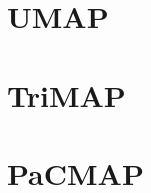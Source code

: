 \section{UMAP}\label{sec:umap}



\section{TriMAP}\label{sec:trimap}



\section{PaCMAP}\label{sec:pacmap}


